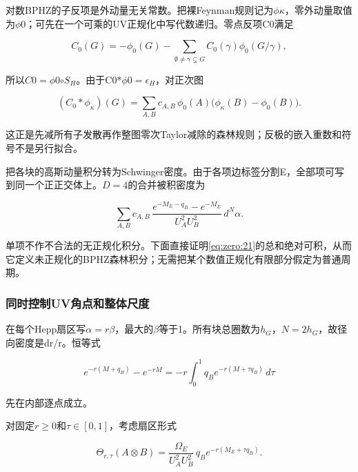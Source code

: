 \documentclass[11pt,a4paper,oneside]{ctexart}
\theoremstyle{cnplain}
\theoremstyle{definition}
\theoremstyle{remark}
\numberwithin{equation}{section}
\begin{document}
对数BPHZ的子反项是外动量无关常数。把裸Feynman规则记为\(\phi \kappa \)，零外动量取值为\(\phi 0\)；可先在一个可乘的UV正规化中写代数递归。零点反项C0满足

\begin{equation}
C_0(G)=-\phi_0(G)-\sum_{\emptyset\ne\gamma\subsetneq G}
                                C_0(\gamma)\phi_0(G/\gamma),
\end{equation}

所以\(C0=\phi 0\)\ensuremath{\circ}\(S_H\)。由于C0*\(\phi 0=\epsilon _H\)，对正次图

\begin{equation}
(C_0*\phi_\kappa)(G)
   =\sum_{A,B}c_{A,B}\,
                  \phi_0(A)\bigl(\phi_\kappa(B)-\phi_0(B)\bigr).       \label{eq:zero:20}
\end{equation}

这正是先减所有子发散再作整图零次Taylor减除的森林规则；反极的嵌入重数和符号不是另行拟合。

把各块的高斯动量积分转为Schwinger密度。由于各项边标签分割E，全部项可写到同一个正正交体上。\(D=4\)的合并被积密度为

\begin{equation}
\sum_{A,B}c_{A,B}\,
 \frac{e^{-M_E-q_B}-e^{-M_E}}{U_A^2U_B^2}\,d^N\alpha.          \label{eq:zero:21}
\end{equation}

单项不作不合法的无正规化积分。下面直接证明\eqref{eq:zero:21}的总和绝对可积，从而它定义未正规化的BPHZ森林积分；无需把某个数值正规化有限部分假定为普通周期。

\subsubsection{同时控制UV角点和整体尺度}\label{sec:zero:8.2}

在每个Hepp扇区写\(\alpha =r\beta \)，最大的\(\beta \)等于1。所有块总圈数为\(h_G\)，\(N=2h_G\)，故径向密度是dr/r。恒等式

\begin{equation}
e^{-r(M+q_B)}-e^{-rM}
      =-r\int_0^1q_Be^{-r(M+\tau q_B)}\,d\tau                 \label{eq:zero:22}
\end{equation}

先在内部逐点成立。

对固定\(r\ge 0\)和\(\tau \in [0,1]\)，考虑扇区形式

\begin{equation}
\Theta_{r,\tau}(A\otimes B)
   =\frac{\Omega_E}{U_A^2U_B^2}\,
                         q_Be^{-r(M_E+\tau q_B)}.             \label{eq:zero:23}
\end{equation}
\end{document}
